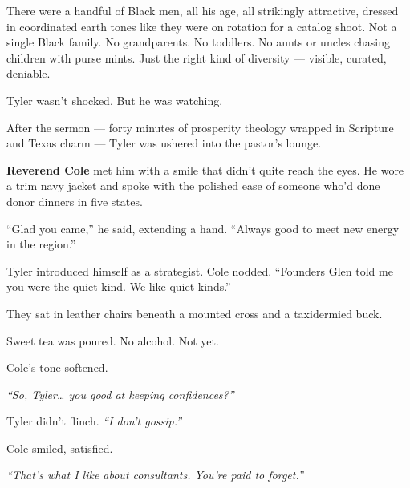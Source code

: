 There were a handful of Black men, all his age, all strikingly attractive, dressed in coordinated earth tones like they were on rotation for a catalog shoot.  
Not a single Black family.  
No grandparents. No toddlers. No aunts or uncles chasing children with purse mints.  
Just the right kind of diversity — visible, curated, deniable.

Tyler wasn’t shocked. But he was watching.

\medskip

After the sermon — forty minutes of prosperity theology wrapped in Scripture and Texas charm — Tyler was ushered into the pastor’s lounge.

\textbf{Reverend Cole} met him with a smile that didn’t quite reach the eyes.  
He wore a trim navy jacket and spoke with the polished ease of someone who’d done donor dinners in five states.

“Glad you came,” he said, extending a hand.  
“Always good to meet new energy in the region.”

Tyler introduced himself as a strategist.  
Cole nodded. “Founders Glen told me you were the quiet kind. We like quiet kinds.”

They sat in leather chairs beneath a mounted cross and a taxidermied buck.

Sweet tea was poured. No alcohol. Not yet.

Cole’s tone softened.

\textit{“So, Tyler… you good at keeping confidences?”}

Tyler didn’t flinch.  
\textit{“I don’t gossip.”}

Cole smiled, satisfied.

\textit{“That’s what I like about consultants. You’re paid to forget.”}


\medskip

